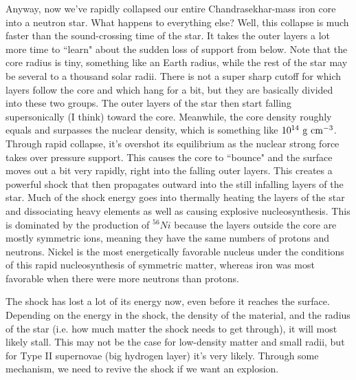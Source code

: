 Anyway, now we've rapidly collapsed our entire Chandrasekhar-mass iron core into a neutron star. What happens to everything else? Well, this collapse is much faster than the sound-crossing time of the star. It takes the outer layers a lot more time to ``learn" about the sudden loss of support from below. Note that the core radius is tiny, something like an Earth radius, while the rest of the star may be several to a thousand solar radii. There is not a super sharp cutoff for which layers follow the core and which hang for a bit, but they are basically divided into these two groups. The outer layers of the star then start falling supersonically (I think) toward the core. Meanwhile, the core density roughly equals and surpasses the nuclear density, which is something like $10^{14}~{\rm g}~{\rm cm}^{-3}$. Through rapid collapse, it's overshot its equilibrium as the nuclear strong force takes over pressure support. This causes the core to ``bounce" and the surface moves out a bit very rapidly, right into the falling outer layers. This creates a powerful shock that then propagates outward into the still infalling layers of the star. Much of the shock energy goes into thermally heating the layers of the star and dissociating heavy elements as well as causing explosive nucleosynthesis. This is dominated by the production of $^{56}Ni$ because the layers outside the core are mostly symmetric ions, meaning they have the same numbers of protons and neutrons. Nickel is the most energetically favorable nucleus under the conditions of this rapid nucleosynthesis of symmetric matter, whereas iron was most favorable when there were more neutrons than protons.

The shock has lost a lot of its energy now, even before it reaches the surface. Depending on the energy in the shock, the density of the material, and the radius of the star (i.e. how much matter the shock needs to get through), it will most likely stall. This may not be the case for low-density matter and small radii, but for Type II supernovae (big hydrogen layer) it's very likely. Through some mechanism, we need to revive the shock if we want an explosion.

